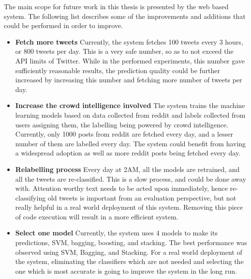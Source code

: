 The main scope for future work in this thesis is presented by the web based system. The following list describes some of the improvements and additions that could be performed in order to improve.\\

\begin{itemize}
    \item{\textbf{Fetch more tweets} Currently, the system fetches 100 tweets every 3 hours, or 800 tweets per day. This is a very safe number, so as to not exceed the API limits of Twitter. While in the performed experiments, this number gave sufficiently reasonable results, the prediction quality could be further increased by increasing this number and fetching more number of tweets per day.}
    \item{\textbf{Increase the crowd intelligence involved} The system trains the machine learning models based on data collected from reddit and labels collected from users assigning them, the labelling being powered by crowd intelligence. Currently, only 1000 posts from reddit are fetched every day, and a lesser number of them are labelled every day. The system could benefit from having a widespread adoption as well as more reddit posts being fetched every day.}
    \item{\textbf{Relabelling process} Every day at 2AM, all the models are retrained, and all the tweets are re-classified. This is a slow process, and could be done away with. Attention worthy text needs to be acted upon immediately, hence re-classifying old tweets is important from an evaluation perspective, but not really helpful in a real world deployment of this system. Removing this piece of code execution will result in a more efficient system.}
    \item{\textbf{Select one model} Currently, the system uses 4 models to make its predictions, SVM, bagging, boosting, and stacking. The best performance was observed using SVM, Bagging, and Stacking. For a real world deployment of the system, eliminating the classifiers which are not needed and selecting the one which is most accurate is going to improve the system in the long run.}
\end{itemize}
